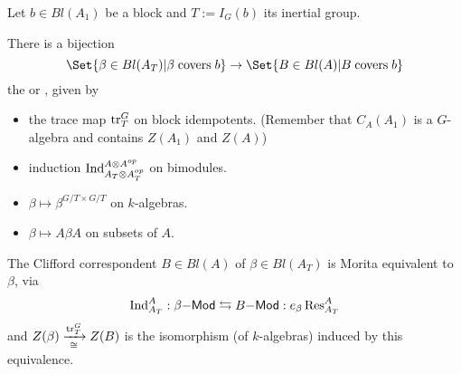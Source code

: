 \begin{theorem}
Let $b\in Bl(A_1)$ be a block and $T:=I_ G(b)$ its inertial group.

There is a bijection
\[\Set{\beta\in Bl(A_T) | \beta \;\text{covers}\; b} \to \Set{B\in Bl(A) | B \;\text{covers}\; b}\]
the  or , given by
\begin{itemize}
\item the trace map $\operatorname{tr}_T^G$ on block idempotents. (Remember that $C_A(A_1)$ is a $G$-algebra and contains $Z(A_1)$ and $Z(A)$)
\item induction $\operatorname{Ind}_{A_T\otimes A_T^{op}}^{A\otimes A^{op}}$ on bimodules.
\item $\beta\mapsto \beta^{ G/T\times G/T}$ on $k$-algebras.
\item $\beta\mapsto A\beta A$ on subsets of $A$.
\end{itemize}
The Clifford correspondent $B\in Bl(A)$ of $\beta\in Bl(A_T)$ is Morita equivalent to $\beta$, via
\[\operatorname{Ind}_{A_T}^A: \beta\mathsf{-Mod} \leftrightarrows B\mathsf{-Mod} : e_\beta \operatorname{Res}_{A_T}^A\]
and $Z(\beta) \xrightarrow[\cong]{\operatorname{tr}_T^G} Z(B)$ is the isomorphism (of $k$-algebras) induced by this equivalence.
\end{theorem}
